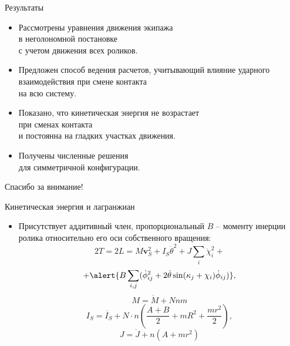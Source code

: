 \documentclass{beamer}
\renewcommand{\vec}[1]{\boldsymbol{\mathbf{#1}}}
\begin{document}
\begin{frame}{Результаты}
  \begin{itemize}
  \item
    Рассмотрены уравнения движения экипажа \\
    в неголономной постановке \\
    с учетом движения всех роликов.
  \item
    Предложен способ ведения расчетов, учитывающий влияние ударного взаимодействия при смене контакта \\
    на всю систему.
  \item
    Показано, что кинетическая энергия не возрастает \\
    при сменах контакта \\
    и постоянна на гладких участках движения.
  \item
    Получены численные решения \\
    для симметричной конфигурации.
  \end{itemize}
  \vspace{3pt}
  \centering
  \textcolor{Periwinkle}{Спасибо за внимание!}
\end{frame}



\begin{frame}{Кинетическая энергия и лагранжиан}
  \begin{itemize}
  \item {
    Присутствует аддитивный член, пропорциональный $B$ -- моменту инерции ролика относительно его оси собственного вращения:
    $$ 2T = 2L = M\vec{v}_S^2 + I_S\dot{\theta}^2 + J\sum_i\dot{\chi}_i^2 + $$
    $$ + \alert{B\sum_{i,j}(\dot{\phi}_{ij}^2 + 2\dot{\theta}\sin(\kappa_j + \chi_i)\dot{\phi}_{ij})}, $$
    $$ M = \mathring{M} + Nnm $$
    $$ I_S = \mathring{I_S} + N\cdot n(\frac{A+B}{2} + mR^2 + \frac{mr^2}{2}), $$
    $$ J = \mathring{J} + n(A + mr^2) $$
  }

  \end{itemize}
\end{frame}
\end{document}
